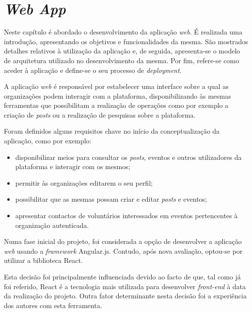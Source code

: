 \pagebreak
\hspace{0pt}
\vfill
{
	\section{\textit{Web App}}
	
	Neste capítulo é abordado o desenvolvimento da aplicação \textit{web}. É realizada uma introdução, apresentando os objetivos e funcionalidades da mesma. São mostrados detalhes relativos à utilização da aplicação e, de seguida, apresenta-se o modelo de arquitetura utilizado no desenvolvimento da mesma. Por fim, refere-se como aceder à aplicação e define-se o seu processo de \textit{deployment}.
	
	\par \smallskip
	
	A aplicação \textit{web} é responsável por estabelecer uma interface sobre a qual as organizações podem interagir com a plataforma, disponibilizando às mesmas ferramentas que possibilitam a realização de operações como por exemplo a criação de \textit{posts} ou a realização de pesquisas sobre a plataforma.
	
	\par \smallskip
	
	Foram definidos alguns requisitos chave no início da conceptualização da aplicação, como por exemplo:
	
	\begin{itemize}
		\item disponibilizar meios para consultar os \textit{posts}, eventos e outros utilizadores da plataforma e interagir com os mesmos; 
		\item permitir às organizações editarem o seu perfil;
		\item possibilitar que as mesmas possam criar e editar \textit{posts} e eventos;
		\item apresentar contactos de voluntários interessados em eventos pertencentes à organização autenticada.
	\end{itemize}
	
	Numa fase inicial do projeto, foi considerada a opção de desenvolver a aplicação \textit{web} usando a \textit{framework} Angular.js. Contudo, após nova avaliação, optou-se por utilizar a biblioteca React. 
	
	\medskip
	
	Esta decisão foi principalmente influenciada devido ao facto de que, tal como já foi referido, React é a tecnologia mais utilizada para desenvolver \textit{front-end} à data da realização do projeto. Outra fator determinante nesta decisão foi a experiência dos autores com esta ferramenta.
}
\vfill
\hspace{0pt}
\pagebreak

